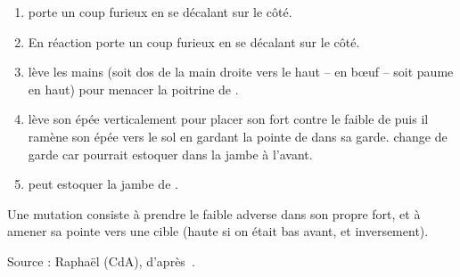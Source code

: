 \begin{exercice}[Mutation]

\begin{enumerate}
	\item \A porte un coup furieux en se décalant sur le côté.
	
	\item En réaction \D porte un coup furieux en se décalant sur le côté.
	
	\item \D lève les mains (soit dos de la main droite vers le haut – en bœuf – soit paume en haut) pour menacer la poitrine de \A.
	
	\item \A lève son épée verticalement pour placer son fort contre le faible de \D puis il ramène son épée vers le sol en gardant la pointe de \D dans sa garde. \A change de garde car \D pourrait estoquer dans la jambe à l'avant.
	
	\item \A peut estoquer la jambe de \D.
\end{enumerate}

Une mutation consiste à prendre le faible adverse dans son propre fort, et à amener sa pointe vers une cible (haute si on était bas avant, et inversement).

Source : Raphaël (CdA), d'après~\cite[fol.~23v-24v, §3, p.~23]{farrell:ringeck}.
\end{exercice}

